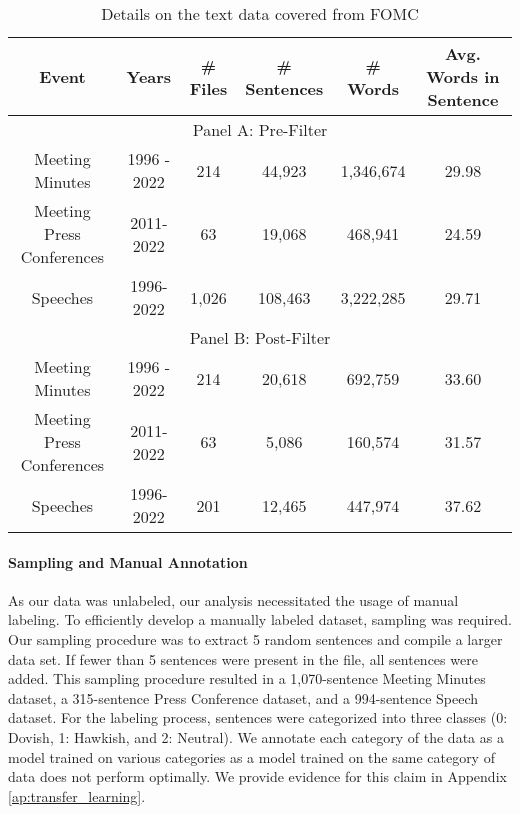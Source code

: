 \documentclass[11pt]{article}
\begin{document}
\begin{table*}
\centering
\footnotesize
\begin{tabular}{cccccc}
\hline
\textbf{Event} & \textbf{Years} & \textbf{\# Files} & \textbf{\# Sentences} & \textbf{\# Words}  & \textbf{Avg. Words in Sentence} \\
\hline
\multicolumn{6}{c}{Panel A: Pre-Filter}\\
\hline
Meeting Minutes & 1996 - 2022 & 214 & 44,923 & 1,346,674  & 29.98 \\
Meeting Press Conferences & 2011-2022 & 63 & 19,068 & 468,941  & 24.59 \\
Speeches & 1996-2022 & 1,026 &  108,463 & 3,222,285  & 29.71 \\
\hline
\multicolumn{6}{c}{Panel B: Post-Filter}\\
\hline
Meeting Minutes & 1996 - 2022 & 214 & 20,618 & 692,759  & 33.60 \\
Meeting Press Conferences & 2011-2022 & 63 & 5,086 & 160,574  & 31.57 \\
Speeches & 1996-2022 & 201 & 12,465 & 447,974  & 37.62 \\
\hline
\end{tabular}
\caption{Details on the text data covered from FOMC}
\label{tb:raw_text_data_info}
\end{table*}


\paragraph{Sampling and Manual Annotation} As our data was unlabeled, our analysis necessitated the usage of manual labeling. To efficiently develop a manually labeled dataset, sampling was required. Our sampling procedure was to extract 5 random sentences and compile a larger data set. If fewer than 5 sentences were present in the file, all sentences were added. This sampling procedure resulted in a 1,070-sentence Meeting Minutes dataset, a 315-sentence Press Conference dataset, and a 994-sentence Speech dataset. For the labeling process, sentences were categorized into three classes (0: Dovish, 1: Hawkish, and 2: Neutral). We annotate each category of the data as a model trained on various categories as a model trained on the same category of data does not perform optimally. We provide evidence for this claim in Appendix \ref{ap:transfer_learning}. 

\end{document}
